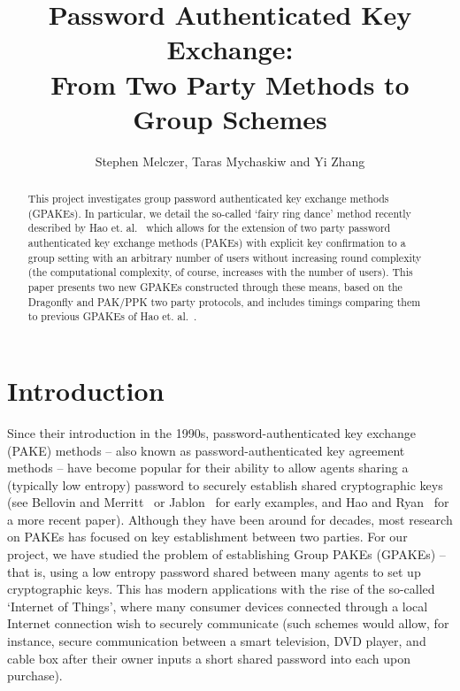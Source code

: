 \documentclass{amsart}
\author{Stephen Melczer, Taras Mychaskiw and Yi Zhang}
\title{Password Authenticated Key Exchange:\\ From Two Party Methods to Group Schemes}
\theoremstyle{remark}
\begin{document}
\begin{abstract}
This project investigates group password authenticated key exchange methods (GPAKEs).  In 
particular, we detail the so-called `fairy ring dance' method recently described by 
Hao et. al.~\cite{HaYiChSh15} which allows for the extension of two party password authenticated key exchange 
methods (PAKEs) with explicit key confirmation to a group setting with an arbitrary number of users without
increasing round complexity (the computational complexity, of course, increases with the number of users).  
This paper presents two new GPAKEs constructed through these means, based on the 
Dragonfly and PAK/PPK two party protocols, and includes timings comparing them to previous GPAKEs of
Hao et. al.~\cite{HaYiChSh15}.
\end{abstract}

\maketitle


\section{Introduction}

Since their introduction in the 1990s, password-authenticated key exchange (PAKE) methods -- 
also known as password-authenticated key agreement methods -- have become popular for their 
ability to allow agents sharing a (typically low entropy) password to securely establish shared 
cryptographic keys (see Bellovin and Merritt~\cite{BeMe92} or Jablon~\cite{Ja96} for early examples, 
and Hao and Ryan~\cite{HaRy2010} for a more recent paper).  Although they have been around for decades, 
most research on PAKEs has focused on key establishment between two parties.  For our project, we 
have studied the problem of establishing Group PAKEs (GPAKEs) -- that is, using a low entropy password 
shared between many agents to set up cryptographic keys.  This has modern applications with the rise
of the so-called `Internet of Things', where many consumer devices connected through a local Internet 
connection wish to securely communicate (such schemes would allow, for instance, secure communication 
between a smart television, DVD player, and cable box after their owner inputs a short shared password 
into each upon purchase).
\\
\end{document}
